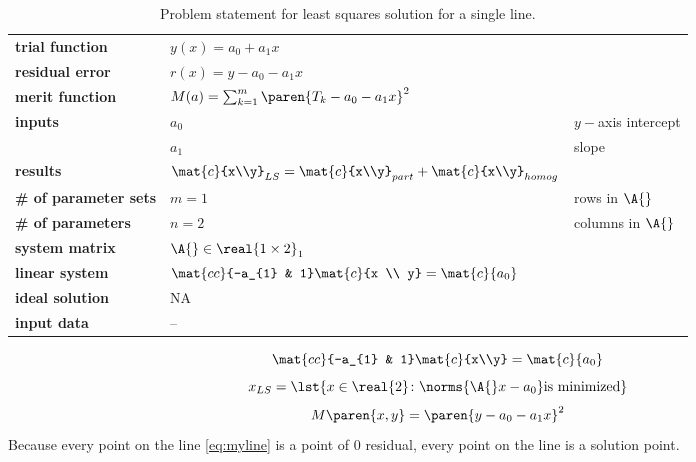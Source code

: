   \begin{table}[h]  %
    \caption{Problem statement for least squares solution for a single line.}
    \begin{center}
      \begin{tabular}{lll}
        \bf{trial function} & $y(x) = a_{0} + a_{1} x$ \\
        \bf{residual error} & $r(x) = y - a_{0} - a_{1} x$ \\
        \bf{merit function} & $M(a) = \sum_{k=1}^{m}\paren{T_{k} - a_{0} - a_{1} x}^{2}$\\
        \bf{inputs}         & $a_{0}$ & $y-$axis intercept \\
                            & $a_{1}$ & slope \\
        \bf{results}        & $\mat{c}{x\\y}_{LS} = \mat{c}{x\\y}_{part} + \mat{c}{x\\y}_{homog}$   \\
        \bf{\# of parameter sets} & $m = 1$ & rows in $\A{}$ \\
        \bf{\# of parameters}   & $n = 2$ & columns in $\A{}$ \\
        \bf{system matrix}  & $\A{} \in \real{1 \times 2}_{1}$ \\
        \bf{linear system}  & $\mat{cc}{-a_{1} & 1} 
                               \mat{c}{x \\ y} = 
                               \mat{c}{a_{0}}$ \\
        \bf{ideal solution} & NA \\
        \bf{input data}     & --
      \end{tabular}
    \end{center}
  \label{tab:bevington inputs}
  \end{table}%

  \begin{equation*}   %
      \mat{cc}{-a_{1} & 1} 
      \mat{c}{x\\y} =
      \mat{c}{a_{0}}
  \end{equation*}
  \begin{equation*}   %
      x_{LS} = \lst{x\in\real{2}\colon \norms{\A{}x - a_{0}} \text{is minimized}}
  \end{equation*}
  \begin{equation*}   %
      M\paren{x,y} = \paren{y - a_{0} - a_{1} x}^{2}
  \end{equation*}
Because every point on the line \eqref{eq:myline} is a point of 0 residual, every point on the line is a solution point. 

